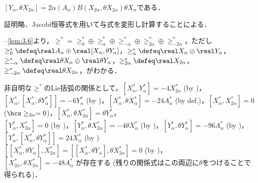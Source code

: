 \begin{lem}\label{lem:3.6}
  $[Y_{\alpha},\theta X_{2\alpha}] = 2\alpha(A_{\alpha})B(X_{2\alpha}, \theta X_{2\alpha})\theta X_{\alpha} $である．

  証明略．Jacobi恒等式を用いて与式を変形し計算することによる．
\end{lem}




\begin{pfwn}{}


  --\ref{lem:3.6}より，$\ge^{*} = \ge^{*}_{0} \oplus \ge^{*}_{\alpha}\oplus \ge^{*}_{-\alpha} \oplus \ge^{*}_{2\alpha} \oplus \ge^{*}_{-2\alpha} $，ただし$\ge^{*}_0 \defeq \real A_{\alpha}\oplus \real[X_{\alpha}, \theta Y_{\alpha}] $，$\ge^{*}_{\alpha} \defeq \real X_{\alpha}\oplus \real Y_{\alpha}  $，$\ge^{*}_{-\alpha} \defeq \real \theta X_{\alpha}\oplus \real \theta Y_{\alpha}  $，$\ge^{*}_{2\alpha} \defeq \real X_{2\alpha} $，$\ge^{*}_{-2\alpha} \defeq \real \theta X_{2\alpha}$，がわかる．

  
  非自明な$\ge^{*} $のLie括弧の関係として，$[X_{\alpha}^{*}, Y_{\alpha}^{*}] = -4X_{2\alpha}^{*} $ (by )，$[X_{\alpha}^{*},[X_{\alpha}^{*}, \theta Y_{\alpha}^{*}]]  = -6Y_{\alpha}^{*}$ (by )，$[X_{\alpha}^{*}, \theta X_{\alpha}^{*}] = -24A_{\alpha}^{*} $ (by def.)，$[X_{\alpha}^{*},X_{2\alpha}^{*}] = 0$ ($\bcs \ge_{3\alpha} = 0$)，$[X_{\alpha}^{*}, \theta X_{2\alpha}^{*}] = \theta Y_{\alpha}^{*} $，\\
  $[Y_{\alpha}^{*},X_{2\alpha}^{*}] = 0$ (by )，$[Y_{\alpha}^{*},\theta X_{2\alpha}^{*}] = -4\theta X_{\alpha}^{*} $ (by )，$[Y_{\alpha}^{*}, \theta Y_{\alpha}^{*}] = -96A_{\alpha}^{*} $ (by )，$[Y_{\alpha}^{*}, [X_{\alpha}^{*}, \theta Y_{\alpha}^{*}]] = 24X_{\alpha}^{*} $ (by ) \\
  $[[X_{\alpha}^{*}, \theta Y_{\alpha}], X_{2\alpha}^{*}] = [[X_{\alpha}^{*}, \theta Y_{\alpha}], \theta X_{2\alpha}^{*}] = 0$ (by )，\\
  $[X_{2\alpha}^{*} ,\theta X_{2\alpha}^{*} ] = -48A_{\alpha}^{*} $
  が存在する (残りの関係式はこの両辺に$\theta$をつけることで得られる)．
  

\end{pfwn}

